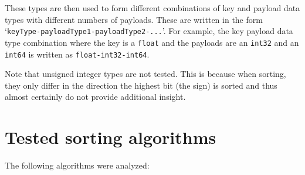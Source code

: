 \documentclass[12pt, a4paper, openright, twoside]{tiarbeit}
\begin{document}
These types are then used to form different combinations of key and payload data
types with different numbers of payloads. These are written in the form
`\texttt{keyType-payloadType1-payloadType2-...}'. For example, the key payload
data type combination where the key is a \texttt{float} and the payloads are
an \texttt{int32} and an \texttt{int64} is written as \texttt{float-int32-int64}.

Note that unsigned integer types are not tested. This is because when sorting,
they only differ in the direction the highest bit (the sign) is sorted and thus
almost certainly do not provide additional insight.


\section{Tested sorting algorithms}
\label{sec:tested-sorting-algorithms}

The following algorithms were analyzed:
\end{document}
